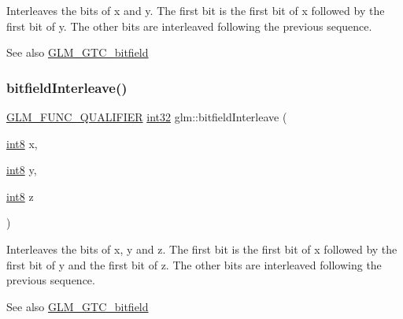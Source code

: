Interleaves the bits of x and y. The first bit is the first bit of x followed by the first bit of y. The other bits are interleaved following the previous sequence.

\begin{DoxySeeAlso}{See also}
\mbox{\hyperlink{group__gtc__bitfield}{G\+L\+M\+\_\+\+G\+T\+C\+\_\+bitfield}} 
\end{DoxySeeAlso}
\mbox{\label{group__gtc__bitfield_ga6dee2ce1c45805063bb7fc5f6fd8f5ca}} 
\subsubsection{\texorpdfstring{bitfield\+Interleave()}{bitfieldInterleave()}\hspace{0.1cm}{\footnotesize\ttfamily [7/16]}}
{\footnotesize\ttfamily \mbox{\hyperlink{setup_8hpp_a33fdea6f91c5f834105f7415e2a64407}{G\+L\+M\+\_\+\+F\+U\+N\+C\+\_\+\+Q\+U\+A\+L\+I\+F\+I\+ER}} \mbox{\hyperlink{group__gtc__type__precision_ga632d8b25f6b61659f39ea4321fab92a4}{int32}} glm\+::bitfield\+Interleave (\begin{DoxyParamCaption}\item[{\mbox{\hyperlink{group__gtc__type__precision_ga96254f9c1c4506fc8eb5cf3301ce8565}{int8}}}]{x,  }\item[{\mbox{\hyperlink{group__gtc__type__precision_ga96254f9c1c4506fc8eb5cf3301ce8565}{int8}}}]{y,  }\item[{\mbox{\hyperlink{group__gtc__type__precision_ga96254f9c1c4506fc8eb5cf3301ce8565}{int8}}}]{z }\end{DoxyParamCaption})}

Interleaves the bits of x, y and z. The first bit is the first bit of x followed by the first bit of y and the first bit of z. The other bits are interleaved following the previous sequence.

\begin{DoxySeeAlso}{See also}
\mbox{\hyperlink{group__gtc__bitfield}{G\+L\+M\+\_\+\+G\+T\+C\+\_\+bitfield}} 
\end{DoxySeeAlso}
\mbox{\label{group__gtc__bitfield_gab9d593a2e916beb8f8137a0dbeae3afe}} 
